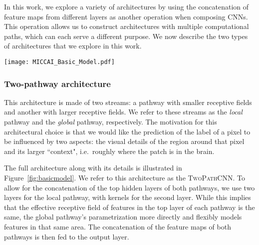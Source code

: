 \documentclass[final,5p,times,twocolumn]{elsarticle}
\begin{document}
In this work, we explore a variety of architectures by using the concatenation of feature maps from different layers as another operation when composing CNNs. This operation allows us to construct architectures with multiple computational paths, which can each serve a different purpose.  We now describe the two types of architectures that we explore in this work.

\begin{figure*}
\centering
\texttt{[image: MICCAI\_Basic\_Model.pdf]}
\caption{Two-pathway CNN architecture (\textsc{TwoPathCNN}). The figure shows the input patch going through two paths of convolutional operations. The feature-maps in the local and global paths are shown in yellow and orange respectively. The convolutional layers used to produce these feature-maps are indicated by dashed lines in the figure. The green box embodies the whole model which in later architectures will be used to indicate the \textsc{TwoPathCNN}.}
\label{fig:basicmodel}
\end{figure*}


\subsubsection{Two-pathway architecture}
\label{sec::twoPAths}

This architecture is made of two streams: a pathway with smaller  receptive fields and another with larger  receptive fields. We refer to these streams as the {\em local} pathway and the {\em global} pathway, respectively. The motivation for this architectural choice is that we would like the prediction of the label of a pixel to be influenced by two aspects: the visual details of the region around that pixel and its larger ``context", i.e.\ roughly where the patch is in the brain. 

 The full architecture along with its details is illustrated in Figure~\ref{fig:basicmodel}. We refer to this architecture as the \textsc{TwoPathCNN}.
To allow for the concatenation of the top hidden layers of both pathways, we use two layers for the local pathway, with  kernels for the second layer. While this implies that the effective receptive field of features in the top layer of each pathway is the same, the global pathway's parametrization more directly and flexibly models features in that same area. The concatenation of the feature maps of both pathways is then fed to the output layer. 
\end{document}
